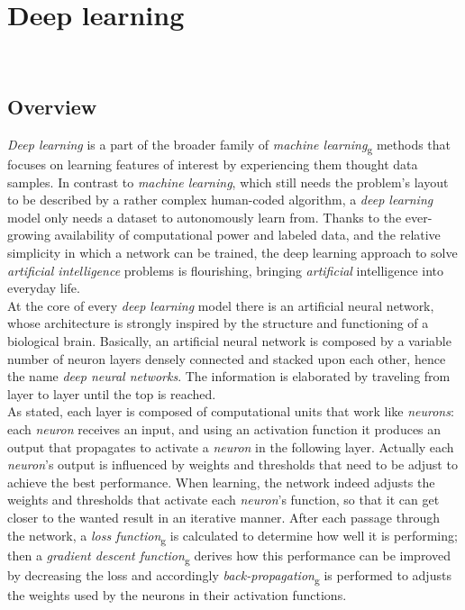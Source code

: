 
\chapter{Deep learning}
\label{cap:deep-learning}

\\

\section{Overview}
	\emph{Deep learning} is a part of the broader family of \emph{\gls{machine learning}}\textsubscript{g} methods that focuses on learning features of interest by experiencing them thought data samples. In contrast to \emph{machine learning}, which still needs the problem's layout to be described by a rather complex human-coded algorithm, a \emph{deep learning} model only needs a dataset to autonomously learn from. Thanks to the ever-growing availability of computational power and labeled data, and the relative simplicity in which a network can be trained, the deep learning approach to solve \emph{artificial intelligence} problems is flourishing, bringing \emph{artificial} intelligence into everyday life. \\
	At the core of every \emph{deep learning} model there is an artificial neural network, whose architecture is strongly inspired by the structure and functioning of a biological brain. Basically, an artificial neural network is composed by a variable number of neuron layers densely connected and stacked upon each other, hence the name \emph{deep neural networks}. The information is elaborated by traveling from layer to layer until the top is reached. \\
		As stated, each layer is composed of computational units that work like \emph{neurons}: each \emph{neuron} receives an input, and using an activation function it produces an output that propagates to activate a \emph{neuron} in the following layer. Actually each \emph{neuron}'s output is influenced by weights and thresholds that need to be adjust to achieve the best performance.
	 When learning, the network indeed adjusts the weights and thresholds that activate each \emph{neuron}'s function, so that it can get closer to the wanted result in an iterative manner. After each passage through the network, a \emph{\gls{loss function}}\textsubscript{g} is calculated to determine how well it is performing; then a \emph{\gls{gradient descent function}}\textsubscript{g} derives how this performance can be improved by decreasing the loss and accordingly \emph{\gls{back-propagation}}\textsubscript{g} is performed to adjusts the weights used by the neurons in their activation functions.
	 
